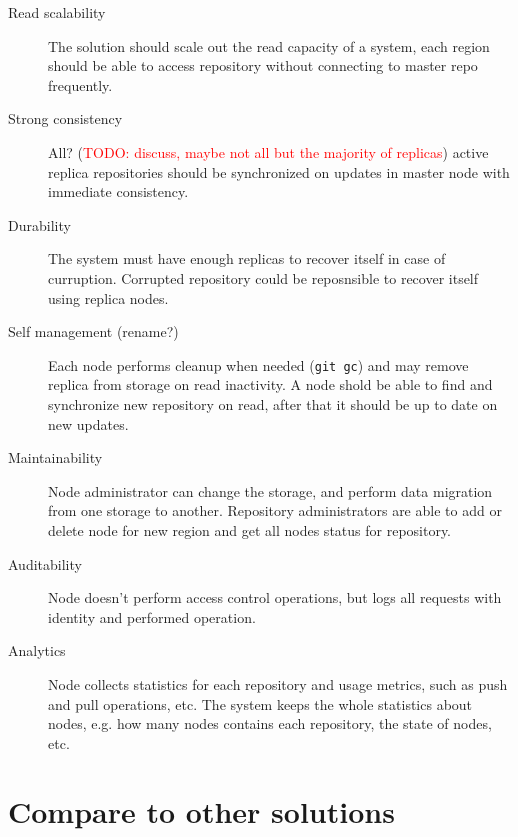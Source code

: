 \documentclass[12pt,oneside]{article}
\newcommand{\code}[1]{\texttt{#1}}
\newcommand{\todo}[1]{\textcolor{red}{TODO: #1}}
\begin{document}
\begin{description}
  \item[Read scalability]
    The solution should scale out the read capacity of a system, each region should be able
    to access repository without connecting to master repo frequently.
  \item[Strong consistency]
    All? (\todo{discuss, maybe not all but the majority of replicas})
    active replica repositories should be synchronized on updates in master node
    with immediate consistency.
  \item[Durability]
    The system must have enough replicas to recover itself in case of curruption.
    Corrupted repository could be reposnsible to recover itself using replica nodes.
  \item[Self management (rename?)]
    Each node performs cleanup when needed (\code{git gc}) and may remove replica
    from storage on read inactivity.
    A node shold be able to find and synchronize new repository on read,
    after that it should be up to date on new updates.
  \item[Maintainability]
    Node administrator can change the storage, and perform data migration from one storage
    to another.
    Repository administrators are able to add or delete node for new region and
    get all nodes status for repository.
  \item[Auditability]
    Node doesn't perform access control operations, but logs all
    requests with identity and performed operation.
  \item[Analytics]
    Node collects statistics for each repository and usage metrics, such as
    push and pull operations, etc. The system keeps the whole statistics about
    nodes, e.g. how many nodes contains each repository, the state of nodes, etc.
\end{description}


\section{Compare to other solutions}
\end{document}

